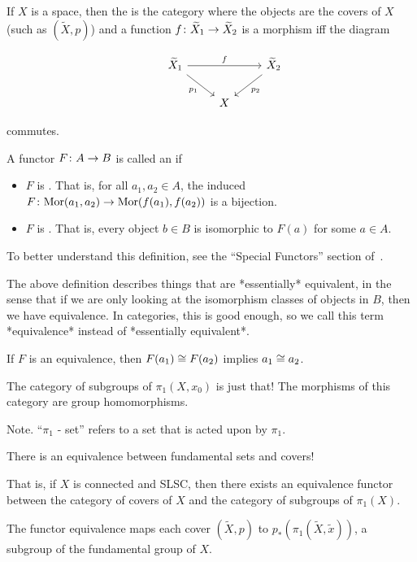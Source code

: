 \documentclass[11pt,leqno,oneside]{amsart}
\numberwithin{thm}{section}
\newcommand{\fund}[1][1]{\pi_{#1}}
\newcommand{\Mor}{\text{Mor}}
\begin{document}
\begin{defn}
  If $X$ is a space, then the  is the category where the objects are the covers of $X$ (such as $(\widetilde{X}, p)$) and a function $f \colon \widetilde{X}_1 \to \widetilde{X}_2$ is a morphism iff the diagram

  $$\begin{tikzcd}
    &\widetilde{X}_1 \arrow[rd, "p_1"'] \arrow[rr, "f"] &&\widetilde{X}_2 \arrow[ld, "p_2"] \\
    &&X
  \end{tikzcd}$$

  commutes.
\end{defn}
\begin{defn}
  A functor $F \colon A \to B$ is called an  if
  \begin{itemize}
    \item $F$ is .  That is, for all $a_1, a_2 \in A$, the induced $F\from \Mor(a_1, a_2) \to \Mor(f(a_1), f(a_2))$ is a bijection.
    \item $F$ is .  That is, every object $b \in B$ is isomorphic to $F(a)$ for some $a \in A$.
  \end{itemize}
\end{defn}
\begin{rmk}
  To better understand this definition, see the ``Special Functors'' section of~\cite{functors}.

  The above definition describes things that are *essentially* equivalent, in the sense that if we are only looking at the isomorphism classes of objects in $B$, then we have equivalence.  In categories, this is good enough, so we call this term *equivalence* instead of *essentially equivalent*.
\end{rmk}
\begin{rmk}
  If $F$ is an equivalence, then $F(a_1) \mathrel{\cong} F(a_2)$ implies $a_1 \mathrel{\cong} a_2$.
\end{rmk}

\begin{defn}
  The {category of subgroups of $\fund(X, x_0)$} is just that!  The morphisms of this category are group homomorphisms.
\end{defn}

Note.  ``$\fund$ - set'' refers to a set that is acted upon by $\fund$.

\begin{thm}
  There is an equivalence between fundamental sets and covers!

  That is, if $X$ is connected and SLSC, then there exists an equivalence functor between the category of covers of $X$ and the category of subgroups of $\fund(X)$.

  The functor equivalence maps each cover $(\widetilde{X}, p)$ to $p_*(\fund(\widetilde{X}, \tilde{x}))$, a subgroup of the fundamental group of $X$.
\end{thm}
\end{document}
